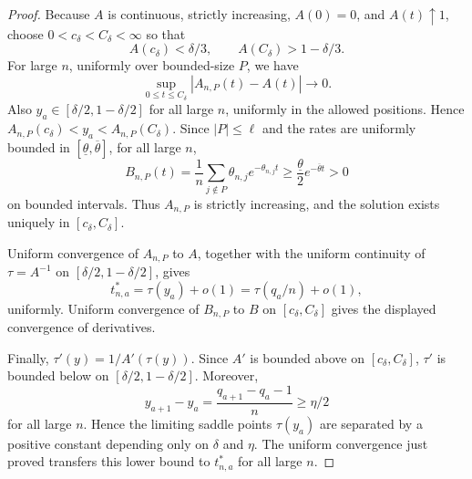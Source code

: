 \documentclass[11pt]{article}
\theoremstyle{remark}
\begin{document}
\begin{proof}
Because \(A\) is continuous, strictly increasing, \(A(0)=0\), and \(A(t)\uparrow1\), choose \(0<c_\delta<C_\delta<\infty\) so that
\[
        A(c_\delta)<\delta/3,
        \qquad
        A(C_\delta)>1-\delta/3 .
\]
For large \(n\), uniformly over bounded-size \(P\), we have
\[
        \sup_{0\le t\le C_\delta}|A_{n,P}(t)-A(t)|\to0.
\]
Also \(y_a\in[\delta/2,1-\delta/2]\) for all large \(n\), uniformly in the allowed positions.  Hence \(A_{n,P}(c_\delta)<y_a<A_{n,P}(C_\delta)\).  Since \(|P|\le\ell\) and the rates are uniformly bounded in \([\underline\theta,\overline\theta]\), for all large \(n\),
\[
        B_{n,P}(t)
        =\frac1n\sum_{j\notin P}\theta_{n,j}e^{-\theta_{n,j}t}
        \ge \frac{\underline\theta}{2}e^{-\overline\theta t}>0
\]
on bounded intervals.  Thus \(A_{n,P}\) is strictly increasing, and the solution exists uniquely in \([c_\delta,C_\delta]\).

Uniform convergence of \(A_{n,P}\) to \(A\), together with the uniform continuity of \(\tau=A^{-1}\) on \([\delta/2,1-\delta/2]\), gives
\[
        t_{n,a}^*=\tau(y_a)+o(1)=\tau(q_a/n)+o(1),
\]
uniformly.  Uniform convergence of \(B_{n,P}\) to \(B\) on \([c_\delta,C_\delta]\) gives the displayed convergence of derivatives.

Finally, \(\tau'(y)=1/A'(\tau(y))\).  Since \(A'\) is bounded above on \([c_\delta,C_\delta]\), \(\tau'\) is bounded below on \([\delta/2,1-\delta/2]\).  Moreover,
\[
        y_{a+1}-y_a=\frac{q_{a+1}-q_a-1}{n}\ge \eta/2
\]
for all large \(n\).  Hence the limiting saddle points \(\tau(y_a)\) are separated by a positive constant depending only on \(\delta\) and \(\eta\).  The uniform convergence just proved transfers this lower bound to \(t_{n,a}^*\) for all large \(n\).
\end{proof}
\end{document}
